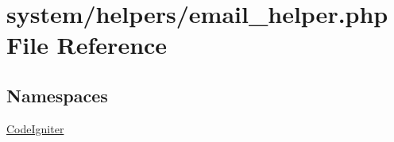 \hypertarget{email__helper_8php}{\section{system/helpers/email\-\_\-helper.php File Reference}
\label{email__helper_8php}
}
\subsection*{Namespaces}
\begin{DoxyCompactItemize}
\item 
\hyperlink{namespace_code_igniter}{Code\-Igniter}
\end{DoxyCompactItemize}
